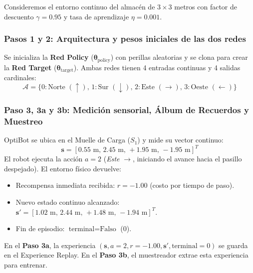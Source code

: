 \begin{calculomanual}
Consideremos el entorno continuo del almacén de $3 \times 3$ metros con factor de descuento $\gamma = 0.95$ y tasa de aprendizaje $\eta = 0.001$.

\subsubsection*{Pasos 1 y 2: Arquitectura y pesos iniciales de las dos redes}
Se inicializa la \textbf{Red Policy} ($\boldsymbol{\theta}_{\text{policy}}$) con perillas aleatorias y se clona para crear la \textbf{Red Target} ($\boldsymbol{\theta}_{\text{target}}$). Ambas redes tienen 4 entradas continuas y 4 salidas cardinales:
\[
  \mathcal{A} = \{0:\text{Norte } (\uparrow), \, 1:\text{Sur } (\downarrow), \, 2:\text{Este } (\rightarrow), \, 3:\text{Oeste } (\leftarrow)\}
\]

\subsubsection*{Paso 3, 3a y 3b: Medición sensorial, Álbum de Recuerdos y Muestreo}
OptiBot se ubica en el Muelle de Carga ($S_1$) y mide su vector continuo:
\[
  \mathbf{s} = [0.55\text{ m}, \, 2.45\text{ m}, \, +1.95\text{ m}, \, -1.95\text{ m}]^T
\]
El robot ejecuta la acción $a = 2$ (\textit{Este} $\rightarrow$, iniciando el avance hacia el pasillo despejado). El entorno físico devuelve:
\begin{itemize}
  \item Recompensa inmediata recibida: $r = -1.00$ (costo por tiempo de paso).
  \item Nuevo estado continuo alcanzado: $\mathbf{s}' = [1.02\text{ m}, \, 2.44\text{ m}, \, +1.48\text{ m}, \, -1.94\text{ m}]^T$.
  \item Fin de episodio: $\text{terminal} = \text{Falso}$ ($0$).
\end{itemize}
En el \textbf{Paso 3a}, la experiencia $(\mathbf{s}, a=2, r=-1.00, \mathbf{s}', \text{terminal}=0)$ se guarda en el Experience Replay. En el \textbf{Paso 3b}, el muestreador extrae esta experiencia para entrenar.


\end{calculomanual}
